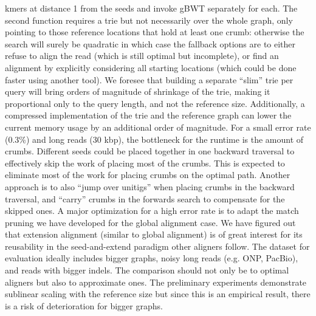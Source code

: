 kmers at distance 1 from the seeds and invoke gBWT separately for each. The
second function requires a trie but not necessarily over the whole graph, only
pointing to those reference locations that hold at least one crumb: otherwise
the \A search will surely be quadratic in which case the fallback options are to
either refuse to align the read (which is still optimal but incomplete), or find
an alignment by explicitly considering all starting locations (which could be
done faster using another tool). We foresee that building a separate ``slim''
trie per query will bring orders of magnitude of shrinkage of the trie, making
it proportional only to the query length, and not the reference size.
Additionally, a compressed implementation of the trie and the reference graph
can lower the current memory usage by an additional order of magnitude. For a
small error rate (0.3\%) and long reads (30 kbp), the bottleneck for the runtime
is the amount of crumbs. Different seeds could be placed together in one
backward traversal to effectively skip the work of placing most of the crumbs.
This is expected to eliminate most of the work for placing crumbs on the optimal
path. Another approach is to also ``jump over unitigs'' when placing crumbs in
the backward traversal, and ``carry'' crumbs in the forwards \A search to
compensate for the skipped ones. A major optimization for a high error rate is
to adapt the match pruning we have developed for the global alignment case. We
have figured out that extension alignment (similar to
global alignment) is of great interest for its reusability in the
seed-and-extend paradigm other aligners follow. The dataset for evaluation
ideally includes bigger graphs, noisy long reads (e.g. ONP, PacBio), and reads
with bigger indels. The comparison should not only be to optimal aligners but
also to approximate ones. The preliminary experiments demonstrate sublinear
scaling with the reference size but since this is an empirical result, there is
a risk of deterioration for bigger graphs.

